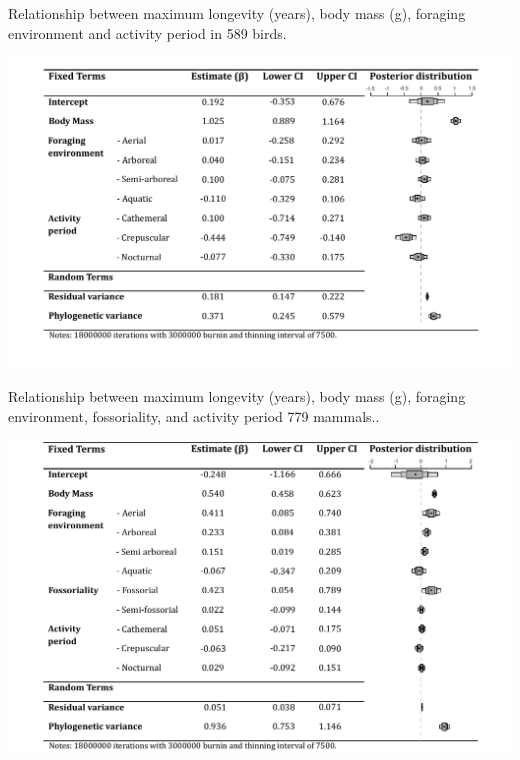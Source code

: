 \begin{table}[h]
  \caption[Table B5.]{Relationship between maximum longevity (years), body mass (g), foraging environment and activity period in 589 birds.}
  \label{tbl:Table B5.}
  \includegraphics[width=\linewidth]{ch3-longevity-appendix/Table_B5.pdf}
\end{table}


\begin{table}[h]
  \caption[Table B6.]{Relationship between maximum longevity (years), body mass (g), foraging environment, fossoriality, and activity period 779 mammals..}
  \label{tbl:Table B9.}
  \includegraphics[width=\linewidth]{ch3-longevity-appendix/Table_B6.pdf}
\end{table}



%
%

